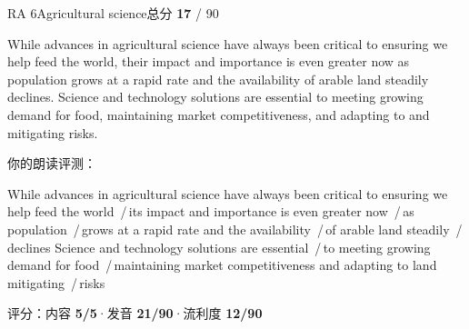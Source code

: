 \documentclass[11pt]{article}
\newcommand{\sfull}[1]{\textcolor{cFix}{\bfseries #1}}     %
\newcommand{\spart}[1]{\textcolor{cPartial}{\bfseries #1}} %
\newcommand{\szero}[1]{\textcolor{cWrong}{\bfseries #1}}   %
\newcommand{\sg}[1]{\textcolor{cSpkGood}{#1}}   %
\newcommand{\sy}[1]{\textcolor{cSpkOk}{#1}}     %
\newcommand{\pse}{{\color{gray}\,/\,}}          %
\begin{document}
\begin{qblock}{RA 6\quad Agricultural science}{总分 \textcolor{cAccent}{\bfseries 17} / 90}
\begin{promptbox}
While advances in agricultural science have always been critical to ensuring we help feed the world, their impact and importance is even greater now as population grows at a rapid rate and the availability of arable land steadily declines. Science and technology solutions are essential to meeting growing demand for food, maintaining market competitiveness, and adapting to and mitigating risks.
\end{promptbox}
\smallskip\par{\footnotesize\color{gray}你的朗读评测：}
\begin{asrbox}
\sg{While} \sy{advances} \sg{in agricultural science have always been critical to} \sg{ensuring we help feed the world} \pse \sg{its impact and importance is even} \sy{greater now} \pse \sy{as population} \pse \sy{grows at} \sg{a rapid rate and the availability} \pse \sy{of arable land steadily} \pse \sg{declines Science and technology solutions are} \sy{essential} \pse \sg{to meeting growing demand for} \sy{food} \pse \sy{maintaining market competitiveness and adapting to land mitigating} \pse \sg{risks}
\end{asrbox}
{\small 评分：内容 \sfull{5/5}\quad·\quad 发音 \spart{21/90}\quad·\quad 流利度 \szero{12/90}}
\end{qblock}
\end{document}
